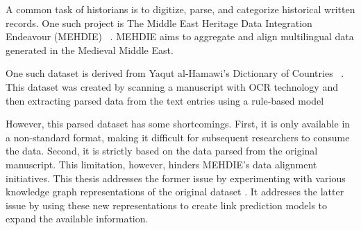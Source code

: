 A common task of historians is to digitize, parse, and categorize historical written records.
One such project is The Middle East Heritage Data Integration Endeavour (MEHDIE) ~\cite{MEHDIE}.
MEHDIE aims to aggregate and align multilingual data generated in the Medieval Middle East.

One such dataset is derived from Yaqut al-Hamawi's Dictionary of Countries ~\cite{Yaqut}.
This dataset was created by scanning a manuscript with OCR technology and then extracting parsed data from
the text entries using a rule-based model~\cite{YaqutRB}

However, this parsed dataset has some shortcomings.
First, it is only available in a non-standard format, making it difficult for subsequent researchers to consume the data.
Second, it is strictly based on the data parsed from the original manuscript.
This limitation, however, hinders MEHDIE's data alignment initiatives.
This thesis addresses the former issue by experimenting with various knowledge graph representations of the original dataset
. It addresses the latter issue by using these new representations to create link prediction models to expand the available
information.